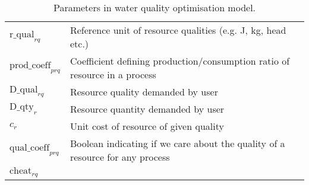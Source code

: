 	\begin{table}[h]
		\centering
		\caption{Parameters in water quality optimisation model.} \label{tab:water_params}
			\begin{tabular}{lp{7cm}}
			\toprule
			$\mbox{r\_qual}_{rq}$ & Reference unit of resource qualities (e.g. J, kg, head etc.) \\
			$\mbox{prod\_coeff}_{prq}$ & Coefficient defining production/consumption ratio of resource in a process \\
			$\mbox{D\_qual}_{rq}$ & Resource quality demanded by user \\
			$\mbox{D\_qty}_r$ & Resource quantity demanded by user \\
			$c_r$ & Unit cost of resource of given quality \\
			$\mbox{qual\_coeff}_{prq}$ & Boolean indicating if we care about the quality of a resource for any process \\
			$\mbox{cheat}_{rq}$ & \\
			\bottomrule
		\end{tabular}
	\end{table}
